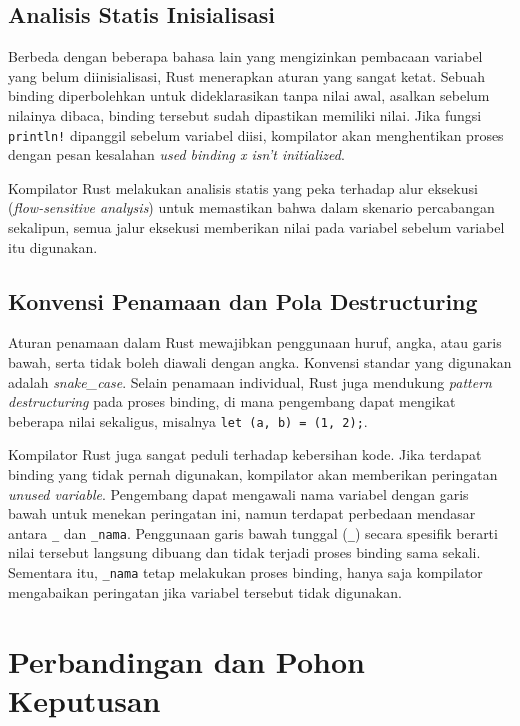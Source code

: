 \documentclass[11pt,a4paper]{article}
\begin{document}
\subsection{Analisis Statis Inisialisasi}

Berbeda dengan beberapa bahasa lain yang mengizinkan pembacaan variabel yang belum diinisialisasi, Rust menerapkan aturan yang sangat ketat. Sebuah binding diperbolehkan untuk dideklarasikan tanpa nilai awal, asalkan sebelum nilainya dibaca, binding tersebut sudah dipastikan memiliki nilai. Jika fungsi \texttt{println!} dipanggil sebelum variabel diisi, kompilator akan menghentikan proses dengan pesan kesalahan \textit{used binding x isn't initialized}.

Kompilator Rust melakukan analisis statis yang peka terhadap alur eksekusi (\textit{flow-sensitive analysis}) untuk memastikan bahwa dalam skenario percabangan sekalipun, semua jalur eksekusi memberikan nilai pada variabel sebelum variabel itu digunakan.

\subsection{Konvensi Penamaan dan Pola Destructuring}

Aturan penamaan dalam Rust mewajibkan penggunaan huruf, angka, atau garis bawah, serta tidak boleh diawali dengan angka. Konvensi standar yang digunakan adalah \textit{snake\_case}. Selain penamaan individual, Rust juga mendukung \textit{pattern destructuring} pada proses binding, di mana pengembang dapat mengikat beberapa nilai sekaligus, misalnya \texttt{let (a, b) = (1, 2);}.

Kompilator Rust juga sangat peduli terhadap kebersihan kode. Jika terdapat binding yang tidak pernah digunakan, kompilator akan memberikan peringatan \textit{unused variable}. Pengembang dapat mengawali nama variabel dengan garis bawah untuk menekan peringatan ini, namun terdapat perbedaan mendasar antara \texttt{\_} dan \texttt{\_nama}. Penggunaan garis bawah tunggal (\texttt{\_}) secara spesifik berarti nilai tersebut langsung dibuang dan tidak terjadi proses binding sama sekali. Sementara itu, \texttt{\_nama} tetap melakukan proses binding, hanya saja kompilator mengabaikan peringatan jika variabel tersebut tidak digunakan.

\section{Perbandingan dan Pohon Keputusan}
\end{document}
